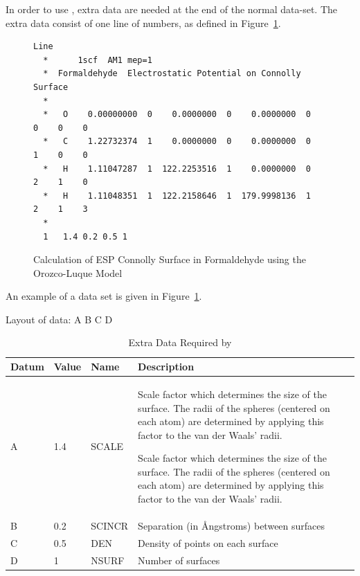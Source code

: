 In order to use , extra data are needed at the end of the normal
data-set.  The extra data consist of one  line of numbers, as defined in
Figure~\ref{mep2}.
\begin{figure}
\begin{makeimage}
\end{makeimage}
\begin{verbatim}
Line
  *      1scf  AM1 mep=1
  *  Formaldehyde  Electrostatic Potential on Connolly Surface
  *
  *   O    0.00000000  0    0.0000000  0    0.0000000  0    0    0    0
  *   C    1.22732374  1    0.0000000  0    0.0000000  0    1    0    0
  *   H    1.11047287  1  122.2253516  1    0.0000000  0    2    1    0
  *   H    1.11048351  1  122.2158646  1  179.9998136  1    2    1    3
  *
  1   1.4 0.2 0.5 1
\end{verbatim}
\caption{\label{mep2data}Calculation of ESP Connolly Surface in  Formaldehyde
using the Orozco-Luque Model}
\end{figure}
An example of a  data set is given in Figure~\ref{mep2data}.
\begin{table}
\caption{\label{mep2} Extra Data Required by }
\begin{center}
Layout of data:   A B C D
\begin{tabular}{llll}  \hline
 Datum & Value & Name   &  Description  \\ \hline

    A  & 1.4   & SCALE  &
\begin{latexonly}
              \parbox[t]{20em}{Scale factor which
              determines the size of the surface. The radii of the
              spheres (centered on each atom) are determined by
              applying this factor to the van der Waals' radii.}
\end{latexonly}
\begin{htmlonly}
              Scale factor which
              determines the size of the surface. The radii of the
              spheres (centered on each atom) are determined by
              applying this factor to the van der Waals' radii.
\end{htmlonly} \\

    B  & 0.2   & SCINCR & Separation (in \AA ngstroms) between surfaces \\
    C  & 0.5   & DEN    & Density of points on each surface \\
    D  & 1     & NSURF  & Number of surfaces \\ \hline
\end{tabular}
\end{center}
\end{table}

